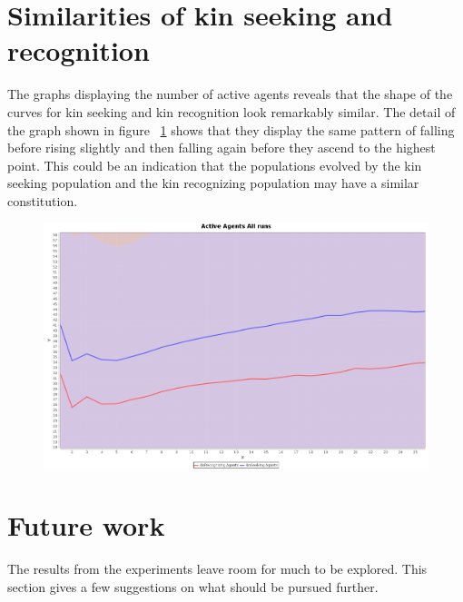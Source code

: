 \documentclass[a4paper]{book}
\begin{document}
\section{Similarities of kin seeking and recognition}
The graphs displaying the number of active agents reveals that the shape of the curves for kin seeking and kin recognition look remarkably similar. 
The detail of the graph shown in figure ~\ref{fig:recogdetail} shows that they display the same pattern of falling before rising slightly and then falling again before they ascend to the highest point. This could be an indication that the populations evolved by the kin seeking population and the kin recognizing population may have a similar constitution.

\begin{figure}[H]
\includegraphics[width=\textwidth]{expr1/recogVSseekingDetail.png}
\label{fig:recogdetail} 
\end{figure}

\section{Future work}

The results from the experiments leave room for much to be explored. 
This section gives a few suggestions on what should be pursued further.
\end{document}
